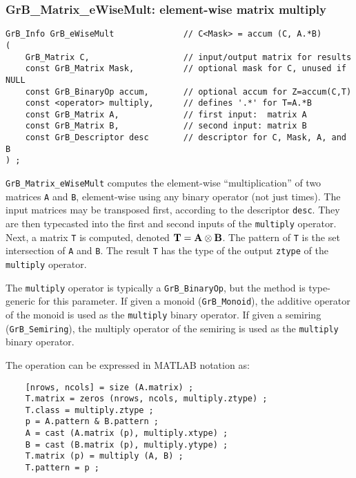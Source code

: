 \documentclass[12pt]{article}
\begin{document}
\newpage
\subsubsection{{\sf GrB\_Matrix\_eWiseMult:} element-wise matrix multiply}
\label{eWiseMult_matrix}

\begin{mdframed}[userdefinedwidth=6in]
{\footnotesize
\begin{verbatim}
GrB_Info GrB_eWiseMult              // C<Mask> = accum (C, A.*B)
(
    GrB_Matrix C,                   // input/output matrix for results
    const GrB_Matrix Mask,          // optional mask for C, unused if NULL
    const GrB_BinaryOp accum,       // optional accum for Z=accum(C,T)
    const <operator> multiply,      // defines '.*' for T=A.*B
    const GrB_Matrix A,             // first input:  matrix A
    const GrB_Matrix B,             // second input: matrix B
    const GrB_Descriptor desc       // descriptor for C, Mask, A, and B
) ;
\end{verbatim}
} \end{mdframed}

\verb'GrB_Matrix_eWiseMult' computes the element-wise ``multiplication'' of two
matrices \verb'A' and \verb'B', element-wise using any binary operator (not
just times).  The input matrices may be transposed first, according to the
descriptor \verb'desc'.  They are then typecasted into the first and second
inputs of the \verb'multiply' operator.  Next, a matrix \verb'T' is computed,
denoted ${\bf T = A \otimes B}$.  The pattern of \verb'T' is the set
intersection of \verb'A' and \verb'B'.  The result \verb'T' has the type of the
output \verb'ztype' of the \verb'multiply' operator.

The \verb'multiply' operator is typically a \verb'GrB_BinaryOp', but the method
is type-generic for this parameter.  If given a monoid (\verb'GrB_Monoid'), the
additive operator of the monoid is used as the \verb'multiply' binary operator.
If given a semiring (\verb'GrB_Semiring'), the multiply operator of the
semiring is used as the \verb'multiply' binary operator.

\vspace{0.05in}
The operation can be expressed in MATLAB notation as:
    {\footnotesize
    \begin{verbatim}
    [nrows, ncols] = size (A.matrix) ;
    T.matrix = zeros (nrows, ncols, multiply.ztype) ;
    T.class = multiply.ztype ;
    p = A.pattern & B.pattern ;
    A = cast (A.matrix (p), multiply.xtype) ;
    B = cast (B.matrix (p), multiply.ytype) ;
    T.matrix (p) = multiply (A, B) ;
    T.pattern = p ; \end{verbatim} }
\end{document}
